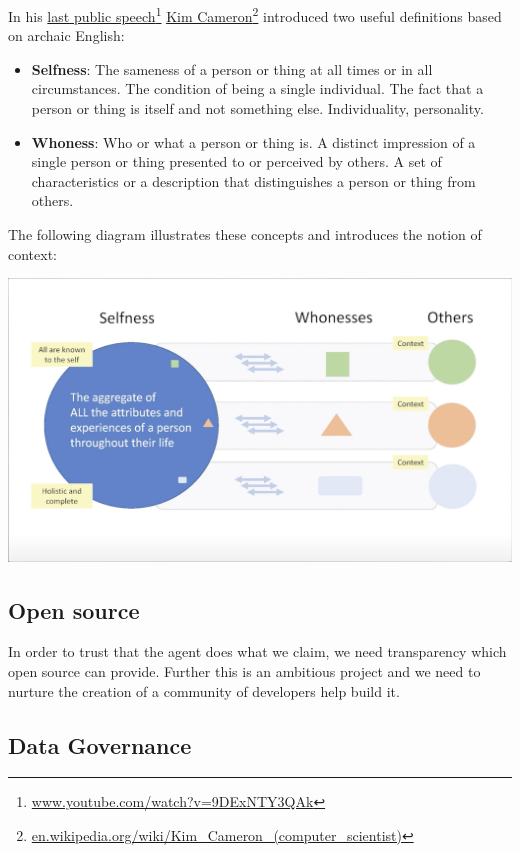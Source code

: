 \documentclass[11pt, oneside]{article}   	%
\newcommand{\hyperfootnote}[1][]{\def\ArgI{{#1}}\hyperfootnoteRelay}
\newcommand\hyperfootnoteRelay[2][]{\href{#1#2}{\ArgI}\footnote{\href{#1#2}{#2}}}
\begin{document}
In his \hyperfootnote[last public speech][https://]{www.youtube.com/watch?v=9DExNTY3QAk}  
\hyperfootnote[Kim Cameron][https://]{en.wikipedia.org/wiki/Kim\_Cameron\_(computer\_scientist)} introduced two useful definitions based on archaic English:

\begin{itemize}
\item \textbf{Selfness}: The sameness of a person or thing at all times or in all circumstances. The condition of being a single individual. The fact that a person or thing is itself and not something else. Individuality, personality. 
\item \textbf{Whoness}: Who or what a person or thing is. A distinct impression of a single person or thing presented to or perceived by others. A set of characteristics or a description that distinguishes a person or thing from others. 
\end{itemize}

The following diagram illustrates these concepts and introduces the notion of context:

\includegraphics[width=\textwidth]{./images/selfness-and-whoness-larger.png}

\subsection{Open source}

In order to trust that the agent does what we claim, we need transparency which open source can provide. Further this is an ambitious project and we need to nurture the creation of a community of developers help build it.

\subsection{Data Governance}
\end{document}
